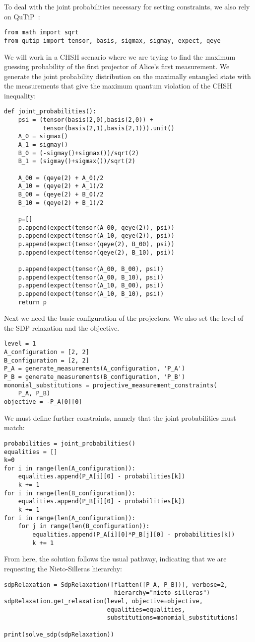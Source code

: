 \documentclass{article}
\begin{document}
To deal with the joint probabilities necessary for setting constraints, we also rely on QuTiP~\citep{johansson2013qutip}:
\begin{verbatim}
from math import sqrt
from qutip import tensor, basis, sigmax, sigmay, expect, qeye
\end{verbatim}
We will work in a CHSH scenario where we are trying to find the maximum guessing probability of the first projector of Alice's first measurement. We generate the joint probability distribution on the maximally entangled state with the measurements that give the maximum quantum violation of the CHSH inequality:
\begin{verbatim}
def joint_probabilities():
    psi = (tensor(basis(2,0),basis(2,0)) + 
           tensor(basis(2,1),basis(2,1))).unit()
    A_0 = sigmax()
    A_1 = sigmay()
    B_0 = (-sigmay()+sigmax())/sqrt(2)
    B_1 = (sigmay()+sigmax())/sqrt(2)

    A_00 = (qeye(2) + A_0)/2
    A_10 = (qeye(2) + A_1)/2
    B_00 = (qeye(2) + B_0)/2
    B_10 = (qeye(2) + B_1)/2

    p=[]
    p.append(expect(tensor(A_00, qeye(2)), psi))
    p.append(expect(tensor(A_10, qeye(2)), psi))
    p.append(expect(tensor(qeye(2), B_00), psi))
    p.append(expect(tensor(qeye(2), B_10), psi))

    p.append(expect(tensor(A_00, B_00), psi))
    p.append(expect(tensor(A_00, B_10), psi))
    p.append(expect(tensor(A_10, B_00), psi))
    p.append(expect(tensor(A_10, B_10), psi))
    return p
\end{verbatim}
Next we need the basic configuration of the projectors. We also set the level of the SDP relaxation and the objective. 
\begin{verbatim}
level = 1
A_configuration = [2, 2]
B_configuration = [2, 2]
P_A = generate_measurements(A_configuration, 'P_A')
P_B = generate_measurements(B_configuration, 'P_B')
monomial_substitutions = projective_measurement_constraints(
    P_A, P_B)
objective = -P_A[0][0]
\end{verbatim}
We must define further constraints, namely that the joint probabilities must match: 
\begin{verbatim}
probabilities = joint_probabilities()
equalities = []
k=0
for i in range(len(A_configuration)):
    equalities.append(P_A[i][0] - probabilities[k])
    k += 1
for i in range(len(B_configuration)):
    equalities.append(P_B[i][0] - probabilities[k])
    k += 1
for i in range(len(A_configuration)):
    for j in range(len(B_configuration)):
        equalities.append(P_A[i][0]*P_B[j][0] - probabilities[k])
        k += 1
\end{verbatim}
From here, the solution follows the usual pathway, indicating that we are requesting the Nieto-Silleras hierarchy:
\begin{verbatim}
sdpRelaxation = SdpRelaxation([flatten([P_A, P_B])], verbose=2,
                               hierarchy="nieto-silleras")
sdpRelaxation.get_relaxation(level, objective=objective, 
                             equalities=equalities,
                             substitutions=monomial_substitutions)

print(solve_sdp(sdpRelaxation))
\end{verbatim}
\end{document}
